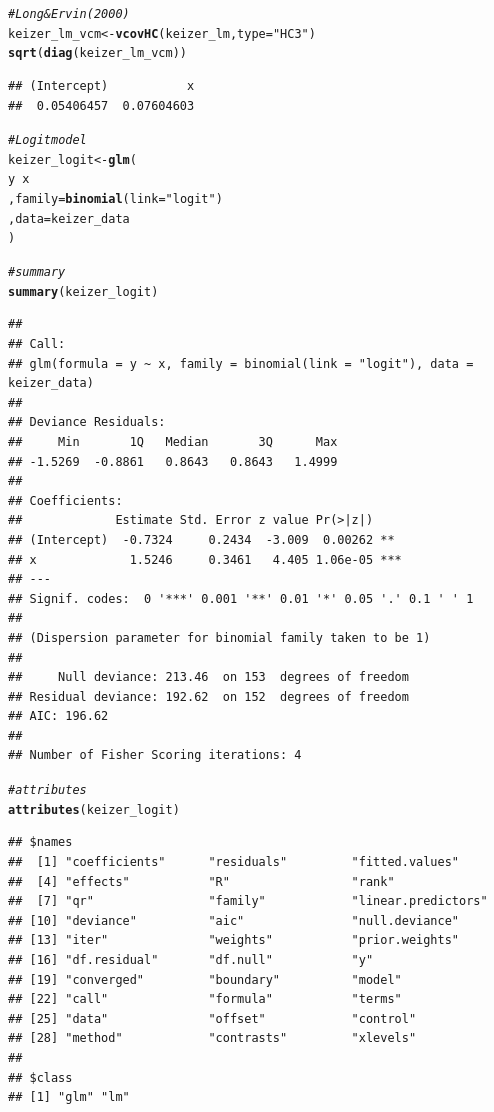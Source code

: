 \documentclass[11pt]{article}\usepackage[]{graphicx}\usepackage[]{color}
\makeatletter
\newcommand{\hlstr}[1]{\textcolor[rgb]{0.192,0.494,0.8}{#1}}%
\newcommand{\hlcom}[1]{\textcolor[rgb]{0.678,0.584,0.686}{\textit{#1}}}%
\newcommand{\hlopt}[1]{\textcolor[rgb]{0,0,0}{#1}}%
\newcommand{\hlstd}[1]{\textcolor[rgb]{0.345,0.345,0.345}{#1}}%
\newcommand{\hlkwb}[1]{\textcolor[rgb]{0.69,0.353,0.396}{#1}}%
\newcommand{\hlkwc}[1]{\textcolor[rgb]{0.333,0.667,0.333}{#1}}%
\newcommand{\hlkwd}[1]{\textcolor[rgb]{0.737,0.353,0.396}{\textbf{#1}}}%
\newenvironment{kframe}{%
 \def\at@end@of@kframe{}%
 \ifinner\ifhmode%
  \def\at@end@of@kframe{\end{minipage}}%
  \begin{minipage}{\columnwidth}%
 \fi\fi%
 \def\FrameCommand##1{\hskip\@totalleftmargin \hskip-\fboxsep
 \colorbox{shadecolor}{##1}\hskip-\fboxsep
     \hskip-\linewidth \hskip-\@totalleftmargin \hskip\columnwidth}%
 \MakeFramed {\advance\hsize-\width
   \@totalleftmargin\z@ \linewidth\hsize
   \@setminipage}}%
 {\par\unskip\endMakeFramed%
 \at@end@of@kframe}
\newenvironment{knitrout}{}{} %
\makeatother
\begin{document}
\begin{knitrout}
\begin{kframe}
\begin{alltt}
\hlcom{# Long & Ervin (2000)}
\hlstd{keizer_lm_vcm} \hlkwb{<-} \hlkwd{vcovHC}\hlstd{(keizer_lm,} \hlkwc{type} \hlstd{=} \hlstr{"HC3"}\hlstd{)}
\hlkwd{sqrt}\hlstd{(}\hlkwd{diag}\hlstd{(keizer_lm_vcm))}
\end{alltt}
\begin{verbatim}
## (Intercept)           x 
##  0.05406457  0.07604603
\end{verbatim}
\begin{alltt}
\hlcom{# Logit model}
\hlstd{keizer_logit} \hlkwb{<-} \hlkwd{glm}\hlstd{(}
          \hlstd{y}\hlopt{~}\hlstd{x}
        \hlstd{,} \hlkwc{family} \hlstd{=} \hlkwd{binomial}\hlstd{(}\hlkwc{link} \hlstd{=} \hlstr{"logit"}\hlstd{)}
        \hlstd{,} \hlkwc{data} \hlstd{= keizer_data}
        \hlstd{)}

\hlcom{# summary}
\hlkwd{summary}\hlstd{(keizer_logit)}
\end{alltt}
\begin{verbatim}
## 
## Call:
## glm(formula = y ~ x, family = binomial(link = "logit"), data = keizer_data)
## 
## Deviance Residuals: 
##     Min       1Q   Median       3Q      Max  
## -1.5269  -0.8861   0.8643   0.8643   1.4999  
## 
## Coefficients:
##             Estimate Std. Error z value Pr(>|z|)    
## (Intercept)  -0.7324     0.2434  -3.009  0.00262 ** 
## x             1.5246     0.3461   4.405 1.06e-05 ***
## ---
## Signif. codes:  0 '***' 0.001 '**' 0.01 '*' 0.05 '.' 0.1 ' ' 1
## 
## (Dispersion parameter for binomial family taken to be 1)
## 
##     Null deviance: 213.46  on 153  degrees of freedom
## Residual deviance: 192.62  on 152  degrees of freedom
## AIC: 196.62
## 
## Number of Fisher Scoring iterations: 4
\end{verbatim}
\begin{alltt}
\hlcom{# attributes}
\hlkwd{attributes}\hlstd{(keizer_logit)}
\end{alltt}
\begin{verbatim}
## $names
##  [1] "coefficients"      "residuals"         "fitted.values"    
##  [4] "effects"           "R"                 "rank"             
##  [7] "qr"                "family"            "linear.predictors"
## [10] "deviance"          "aic"               "null.deviance"    
## [13] "iter"              "weights"           "prior.weights"    
## [16] "df.residual"       "df.null"           "y"                
## [19] "converged"         "boundary"          "model"            
## [22] "call"              "formula"           "terms"            
## [25] "data"              "offset"            "control"          
## [28] "method"            "contrasts"         "xlevels"          
## 
## $class
## [1] "glm" "lm"
\end{verbatim}
\end{kframe}
\end{knitrout}
\end{document}
